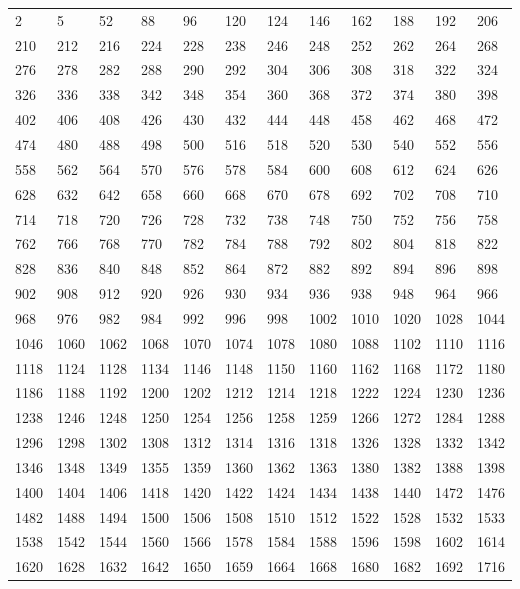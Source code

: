 \begin{center}
\footnotesize
\begin{longtable}{llllllllllll}
2 &5 &52 &88 &96 &120 &124 &146 &162 &188 &192 &206 \\
210 &212 &216 &224 &228 &238 &246 &248 &252 &262 &264 &268 \\
276 &278 &282 &288 &290 &292 &304 &306 &308 &318 &322 &324 \\
326 &336 &338 &342 &348 &354 &360 &368 &372 &374 &380 &398 \\
402 &406 &408 &426 &430 &432 &444 &448 &458 &462 &468 &472 \\
474 &480 &488 &498 &500 &516 &518 &520 &530 &540 &552 &556 \\
558 &562 &564 &570 &576 &578 &584 &600 &608 &612 &624 &626 \\
628 &632 &642 &658 &660 &668 &670 &678 &692 &702 &708 &710 \\
714 &718 &720 &726 &728 &732 &738 &748 &750 &752 &756 &758 \\
762 &766 &768 &770 &782 &784 &788 &792 &802 &804 &818 &822 \\
828 &836 &840 &848 &852 &864 &872 &882 &892 &894 &896 &898 \\
902 &908 &912 &920 &926 &930 &934 &936 &938 &948 &964 &966 \\
968 &976 &982 &984 &992 &996 &998 &1002 &1010 &1020 &1028 &1044 \\
1046 &1060 &1062 &1068 &1070 &1074 &1078 &1080 &1088 &1102 &1110 &1116 \\
1118 &1124 &1128 &1134 &1146 &1148 &1150 &1160 &1162 &1168 &1172 &1180 \\
1186 &1188 &1192 &1200 &1202 &1212 &1214 &1218 &1222 &1224 &1230 &1236 \\
1238 &1246 &1248 &1250 &1254 &1256 &1258 &1259 &1266 &1272 &1284 &1288 \\
1296 &1298 &1302 &1308 &1312 &1314 &1316 &1318 &1326 &1328 &1332 &1342 \\
1346 &1348 &1349 &1355 &1359 &1360 &1362 &1363 &1380 &1382 &1388 &1398 \\
1400 &1404 &1406 &1418 &1420 &1422 &1424 &1434 &1438 &1440 &1472 &1476 \\
1482 &1488 &1494 &1500 &1506 &1508 &1510 &1512 &1522 &1528 &1532 &1533 \\
1538 &1542 &1544 &1560 &1566 &1578 &1584 &1588 &1596 &1598 &1602 &1614 \\
1620 &1628 &1632 &1642 &1650 &1659 &1664 &1668 &1680 &1682 &1692 &1716 \\

\end{longtable}
\end{center}
